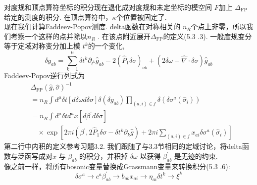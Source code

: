 对度规和顶点算符坐标的积分现在退化成对度规和未定坐标的模空间 $F$加上 $\Delta_{\mathrm{FP}} $ 给定的测度的积分. 在顶点算符中，$\kappa$个位置被固定了.\\
现在我们计算Faddeev-Popov测度. delta函数在对称相关的 $n_{R}$个点上非零，所以我们考察一个这样的点并除以$n_{R} $ . 在该点附近展开$\Delta_{\mathrm{FP}}$的定义(5.3 .3). 一般度规变分等于定域对称变分加上模 $t^{k}$的一个变化,
\begin{equation}
	\delta g_{a b}=\sum_{k=1}^{\mu} \delta t^{k} \partial_{t^{k}} \hat{g}_{a b}-2\left(\hat{P}_{1} \delta \sigma\right)_{a b}+(2 \delta \omega-\hat{\nabla} \cdot \delta \sigma) \hat{g}_{a b}
\end{equation}
Faddeev-Popov逆行列式为
\begin{equation}
	\begin{aligned}
		&\Delta_{\mathrm{FP}}(\hat{g}, \hat{\sigma})^{-1} \\
		&=n_{R} \int d^{\mu} \delta t[d \delta \omega d \delta \sigma] \delta\left(\delta g_{a b}\right) \prod_{(a, i) \in f} \delta\left(\delta \sigma^{a}\left(\hat{\sigma}_{i}\right)\right)\\
		&=n_{R}  \int d^{\mu} \delta t d^{\kappa} x\left[d \beta^{\prime} d \delta \sigma\right] \\
		&\quad \times \exp \left[2 \pi i\left(\beta^{\prime}, 2 \hat{P}_{1} \delta \sigma-\delta t^{k} \partial_{k} \hat{g}\right)+2 \pi i \sum_{(a, i) \in f} x_{a i} \delta \sigma^{a}\left(\hat{\sigma}_{i}\right)\right]
	\end{aligned}
\end{equation}
第二行中内积的定义参考习题3.2. 我们跟随了与3.3节相同的定域讨论，将delta函数与泛函写成对$x$ 与 $\beta_{a b}$ 的积分，并积掉 $\delta \omega$ 以获得 $\beta_{a b}^{\prime}$ 是无迹的约束.\\
像之前一样，将所有bosonic变量替换成Grassmann变量来转换积分(5.3 .6):
\begin{subequations}
\begin{equation}
\delta \sigma^{a}  \rightarrow c^{a} 
\end{equation}
\begin{equation}
\beta_{a b}^{\prime}  \rightarrow b_{a b} 
\end{equation}
\begin{equation}
x_{a i}  \rightarrow \eta_{a i} 
\end{equation}
\begin{equation}
\delta t^{k}  \rightarrow \xi^{k}
\end{equation}	
\end{subequations}
